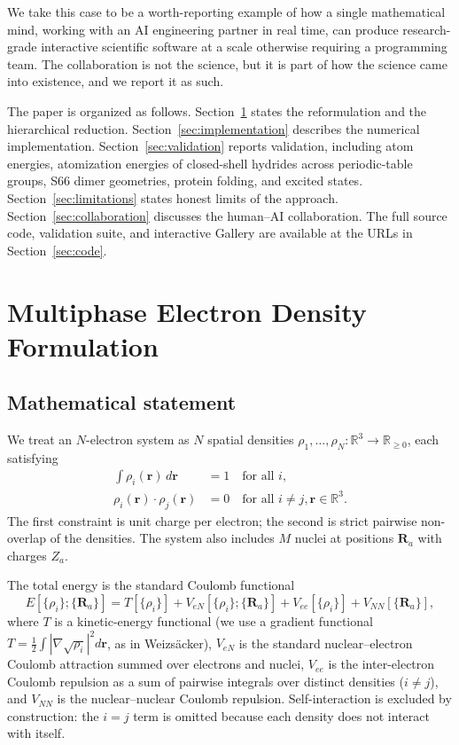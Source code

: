 \documentclass[11pt]{article}
\begin{document}
We take this case to be a worth-reporting example of how a single mathematical mind, working with an AI engineering partner in real time, can produce research-grade interactive scientific software at a scale otherwise requiring a programming team. The collaboration is not the science, but it is part of how the science came into existence, and we report it as such.

The paper is organized as follows. Section~\ref{sec:reformulation} states the reformulation and the hierarchical reduction. Section~\ref{sec:implementation} describes the numerical implementation. Section~\ref{sec:validation} reports validation, including atom energies, atomization energies of closed-shell hydrides across periodic-table groups, S66 dimer geometries, protein folding, and excited states. Section~\ref{sec:limitations} states honest limits of the approach. Section~\ref{sec:collaboration} discusses the human--AI collaboration. The full source code, validation suite, and interactive Gallery are available at the URLs in Section~\ref{sec:code}.

\section{Multiphase Electron Density Formulation}\label{sec:reformulation}

\subsection{Mathematical statement}

We treat an $N$-electron system as $N$ spatial densities $\rho_1, \ldots, \rho_N : \mathbb{R}^3 \to \mathbb{R}_{\geq 0}$, each satisfying
\begin{align}
\int \rho_i(\mathbf{r})\, d\mathbf{r} &= 1 \quad \text{for all } i, \\
\rho_i(\mathbf{r}) \cdot \rho_j(\mathbf{r}) &= 0 \quad \text{for all } i \neq j, \mathbf{r} \in \mathbb{R}^3.
\end{align}
The first constraint is unit charge per electron; the second is strict pairwise non-overlap of the densities. The system also includes $M$ nuclei at positions $\mathbf{R}_a$ with charges $Z_a$.

The total energy is the standard Coulomb functional
\begin{equation}
E[\{\rho_i\}; \{\mathbf{R}_a\}] = T[\{\rho_i\}] + V_{eN}[\{\rho_i\}; \{\mathbf{R}_a\}] + V_{ee}[\{\rho_i\}] + V_{NN}[\{\mathbf{R}_a\}],
\end{equation}
where $T$ is a kinetic-energy functional (we use a gradient functional $T = \tfrac{1}{2} \int |\nabla \sqrt{\rho_i}|^2 d\mathbf{r}$, as in Weizs\"acker), $V_{eN}$ is the standard nuclear--electron Coulomb attraction summed over electrons and nuclei, $V_{ee}$ is the inter-electron Coulomb repulsion as a sum of pairwise integrals over distinct densities ($i \neq j$), and $V_{NN}$ is the nuclear--nuclear Coulomb repulsion. Self-interaction is excluded by construction: the $i = j$ term is omitted because each density does not interact with itself.
\end{document}
